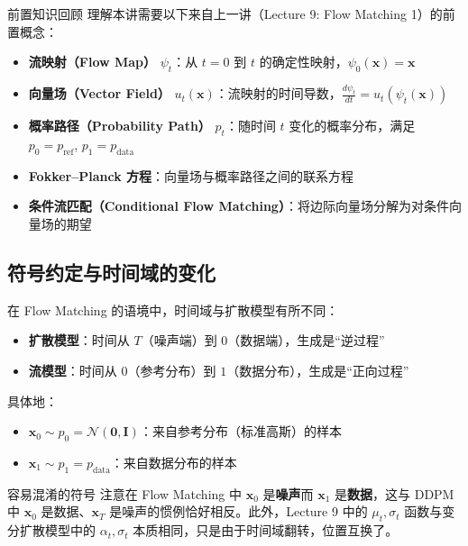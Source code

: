 \documentclass[a4paper]{article}
\begin{document}
\begin{knowledgebox}{前置知识回顾}
理解本讲需要以下来自上一讲（Lecture 9: Flow Matching 1）的前置概念：
\begin{itemize}
    \item \textbf{流映射（Flow Map）} $\psi_t$：从 $t=0$ 到 $t$ 的确定性映射，$\psi_0(\mathbf{x}) = \mathbf{x}$
    \item \textbf{向量场（Vector Field）} $u_t(\mathbf{x})$：流映射的时间导数，$\frac{d\psi_t}{dt} = u_t(\psi_t(\mathbf{x}))$
    \item \textbf{概率路径（Probability Path）} $p_t$：随时间 $t$ 变化的概率分布，满足 $p_0 = p_{\text{ref}}$, $p_1 = p_{\text{data}}$
    \item \textbf{Fokker--Planck 方程}：向量场与概率路径之间的联系方程
    \item \textbf{条件流匹配（Conditional Flow Matching）}：将边际向量场分解为对条件向量场的期望
\end{itemize}
\end{knowledgebox}

\subsection{符号约定与时间域的变化}

在 Flow Matching 的语境中，时间域与扩散模型有所不同：

\begin{itemize}
    \item \textbf{扩散模型}：时间从 $T$（噪声端）到 $0$（数据端），生成是``逆过程''
    \item \textbf{流模型}：时间从 $0$（参考分布）到 $1$（数据分布），生成是``正向过程''
\end{itemize}

具体地：
\begin{itemize}
    \item $\mathbf{x}_0 \sim p_0 = \mathcal{N}(\mathbf{0}, \mathbf{I})$：来自参考分布（标准高斯）的样本
    \item $\mathbf{x}_1 \sim p_1 = p_{\text{data}}$：来自数据分布的样本
\end{itemize}

\begin{warningbox}{容易混淆的符号}
注意在 Flow Matching 中 $\mathbf{x}_0$ 是\textbf{噪声}而 $\mathbf{x}_1$ 是\textbf{数据}，这与 DDPM 中 $\mathbf{x}_0$ 是数据、$\mathbf{x}_T$ 是噪声的惯例恰好相反。此外，Lecture 9 中的 $\mu_t, \sigma_t$ 函数与变分扩散模型中的 $\alpha_t, \sigma_t$ 本质相同，只是由于时间域翻转，位置互换了。
\end{warningbox}
\end{document}
